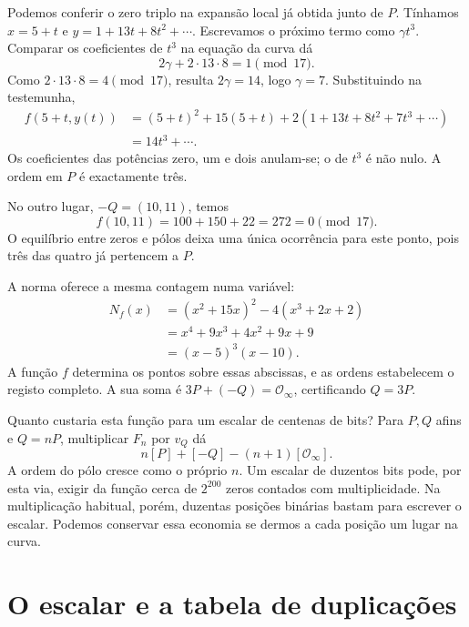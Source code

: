 Podemos conferir o zero triplo na expansão local já obtida junto de \(P\).
Tínhamos
\(x=5+t\) e \(y=1+13t+8t^2+\cdots\). Escrevamos o próximo
termo como \(\gamma t^3\). Comparar os coeficientes de \(t^3\)
na equação da curva dá
\[
 2\gamma+2\cdot13\cdot8=1\pmod {17}.
\]
Como \(2\cdot13\cdot8=4\pmod {17}\), resulta
\(2\gamma=14\), logo \(\gamma=7\). Substituindo na testemunha,
\begin{align*}
 f(5+t,y(t))
 &=(5+t)^2+15(5+t)+2(1+13t+8t^2+7t^3+\cdots)\\
 &=14t^3+\cdots.
\end{align*}
Os coeficientes das potências zero, um e dois anulam-se; o de
\(t^3\) é não nulo. A ordem em \(P\) é exactamente três.

No outro lugar, \(-Q=(10,11)\), temos
\[
 f(10,11)=100+150+22=272=0\pmod {17}.
\]
O equilíbrio entre zeros e pólos deixa uma única ocorrência para este ponto, pois
três das quatro já pertencem a \(P\).

A norma oferece a mesma contagem numa variável:
\begin{align*}
 N_f(x)
 &=(x^2+15x)^2-4(x^3+2x+2)\\
 &=x^4+9x^3+4x^2+9x+9\\
 &=(x-5)^3(x-10).
\end{align*}
A função \(f\) determina os pontos sobre essas abscissas, e as
ordens estabelecem o registo completo. A sua soma é
\(3P+(-Q)=\mathcal O_\infty\), certificando \(Q=3P\).

Quanto custaria esta função para um escalar de centenas de bits? Para
\(P,Q\) afins e \(Q=nP\), multiplicar \(F_n\) por \(v_Q\) dá
\[
 n[P]+[-Q]-(n+1)[\mathcal O_\infty].
\]
A ordem do pólo cresce como o próprio \(n\). Um escalar de duzentos
bits pode, por esta via, exigir da função cerca de \(2^{200}\) zeros
contados com multiplicidade. Na multiplicação habitual, porém,
duzentas posições binárias bastam para escrever o escalar. Podemos
conservar essa economia se dermos a cada posição um lugar na curva.

\section{O escalar e a tabela de duplicações}
\label{sec:divisors-scalar-table}
\label{sec:divisors-function-bound}

